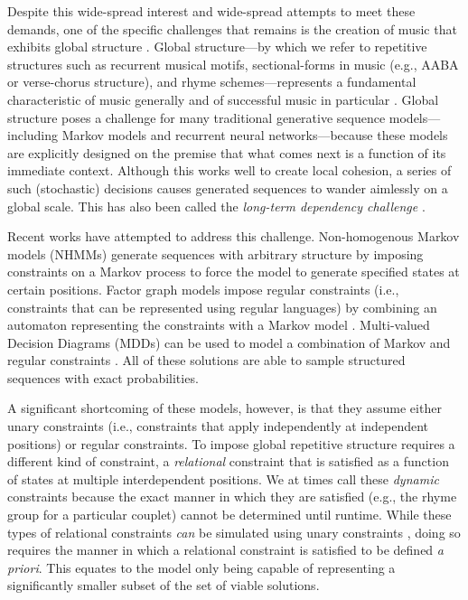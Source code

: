 \documentclass[phd,electronic,oneside,twosidetoc,letterpaper,chaptercenter,parttop,lol,lof,lot]{byumsphd}
\begin{document}
Despite this wide-spread interest and wide-spread attempts to meet these demands, one of the specific challenges that remains is the creation of music that exhibits global structure \cite{Jaques2016,roy2016enforcing}. Global structure---by which we refer to repetitive structures such as recurrent musical motifs, sectional-forms in music (e.g., AABA or verse-chorus structure), and rhyme schemes---represents a fundamental characteristic of music generally and of successful music in particular \cite{Nunes2014}. Global structure poses a challenge for many traditional generative sequence models---including Markov models and recurrent neural networks---because these models are explicitly designed on the premise that what comes next is a function of its immediate context. Although this works well to create local cohesion, a series of such (stochastic) decisions causes generated sequences to wander aimlessly on a global scale. This has also been called the \emph{long-term dependency challenge} \cite{collins2017computer}.

Recent works have attempted to address this challenge. Non-homogenous Markov models (NHMMs) \cite{pachet2011finite} generate sequences with arbitrary structure by imposing constraints on a Markov process to force the model to generate specified states at certain positions. Factor graph models impose regular constraints (i.e., constraints that can be represented using regular languages) by combining an automaton representing the constraints with a Markov model \cite{papadopoulos2015exact}. Multi-valued Decision Diagrams (MDDs) can be used to model a combination of Markov and regular constraints \cite{perez2017mdds}. All of these solutions are able to sample structured sequences with exact probabilities.

A significant shortcoming of these models, however, is that they assume either unary constraints (i.e., constraints that apply independently at independent positions) or regular constraints. To impose global repetitive structure requires a different kind of constraint, a \emph{relational} constraint that is satisfied as a function of states at multiple interdependent positions. We at times call these \emph{dynamic} constraints because the exact manner in which they are satisfied (e.g., the rhyme group for a particular couplet) cannot be determined until runtime. While these types of relational constraints \emph{can} be simulated using unary constraints \cite{Barbieri2012MarkovStyle}, doing so requires the manner in which a relational constraint is satisfied to be defined \emph{a priori}. This equates to the model only being capable of representing a significantly smaller subset of the set of viable solutions. 
\end{document}
